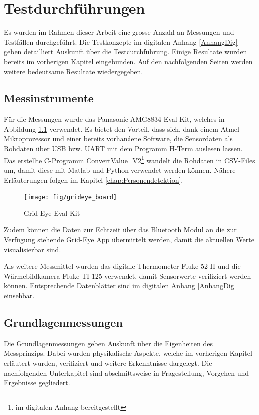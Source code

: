 \chapter{Testdurchführungen}
\label{chap:Testphasen}

Es wurden im Rahmen dieser Arbeit eine grosse Anzahl an Messungen und Testfällen durchgeführt. Die Testkonzepte im digitalen Anhang \ref{AnhangDig} geben detailliert Auskunft über die Testdurchführung. Einige Resultate wurden bereits im vorherigen Kapitel eingebunden. Auf den nachfolgenden Seiten werden weitere bedeutsame Resultate wiedergegeben. 

\section{Messinstrumente}

Für die Messungen wurde das Panasonic AMG8834 Eval Kit, welches in Abbildung \ref{fig:grideyeboard} verwendet. Es bietet den Vorteil, dass sich, dank einem Atmel Mikroprozessor und einer bereits vorhandene Software, die Sensordaten als Rohdaten über USB bzw. \ac{UART} mit dem Programm H-Term auslesen lassen. 
Das erstellte C-Programm ConvertValue\_V2\footnote[13]{im digitalen Anhang bereitgestellt} wandelt die Rohdaten in \ac{CSV}-Files um, damit diese mit Matlab und Python verwendet werden können. Nähere Erläuterungen folgen im Kapitel \ref{chap:Personendetektion}.


\begin{figure}[H]
	\centering
	\texttt{[image: fig/grideye\_board]}
	\caption[Grid Eye Eval Kit]{Grid Eye Eval Kit}
	\label{fig:grideyeboard}
	\protect\cite{AMG8834}
\end{figure}



Zudem können die Daten zur Echtzeit über das Bluetooth Modul an die zur Verfügung stehende Grid-Eye App übermittelt werden, damit die aktuellen Werte visualisierbar sind.

Als weitere Messmittel wurden das digitale Thermometer Fluke 52-II und die Wärmebildkamera Fluke TI-125 verwendet, damit Sensorwerte verifiziert werden können. Entsprechende Datenblätter sind im digitalen Anhang \ref{AnhangDig} einsehbar.

\section{Grundlagenmessungen}

Die Grundlagenmessungen geben Auskunft über die Eigenheiten des Messprinzips. Dabei wurden physikalische Aspekte, welche im vorherigen Kapitel erläutert wurden, verifiziert und weitere Erkenntnisse dargelegt. Die nachfolgenden Unterkapitel sind abschnittsweise in Fragestellung, Vorgehen und Ergebnisse gegliedert.

